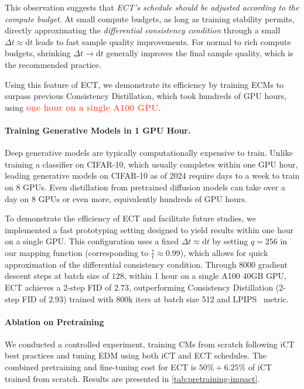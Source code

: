 This observation suggests that \emph{ECT's schedule should be adjusted according to the compute budget}. At small compute budgets, as long as training stability permits, directly approximating the \textit{differential consistency condition} through a small $\Delta t \approx \mathrm{d}t$ leads to fast sample quality improvements. For normal to rich compute budgets, shrinking $\Delta t \to \mathrm{d}t$ generally improves the final sample quality, which is the recommended practice.

Using this feature of ECT, we demonstrate its efficiency by training ECMs to surpass previous Consistency Distillation, which took hundreds of GPU hours, using \textcolor{tomato}{\textbf{one hour on a single A100 GPU}}.

\paragraph{Training Generative Models in 1 GPU Hour.} Deep generative models are typically computationally expensive to train. Unlike training a classifier on CIFAR-10, which usually completes within one GPU hour, leading generative models on CIFAR-10 as of 2024 require days to a week to train on 8 GPUs. Even distillation from pretrained diffusion models can take over a day on 8 GPUs or even more, equivalently hundreds of GPU hours.

To demonstrate the efficiency of ECT and facilitate future studies, we implemented a fast prototyping setting designed to yield results within one hour on a single GPU. This configuration uses a fixed $\Delta t \approx \mathrm{d}t$ by setting $q=256$ in our mapping function (corresponding to $\frac{r}{t} \approx 0.99$), which allows for quick approximation of the differential consistency condition.  Through $8000$ gradient descent steps at batch size of $128$, within 1 hour on a single A100 40GB GPU, ECT achieves a 2-step FID of $2.73$, outperforming Consistency Distillation (2-step FID of $2.93$) trained with 800k iters at batch size 512 and LPIPS~\citep{lpips} metric.


\paragraph{Ablation on Pretraining}
We conducted a controlled experiment, training CMs from scratch following iCT best practices and tuning EDM using both iCT and ECT schedules. The combined pretraining and fine-tuning cost for ECT is $50\% + 6.25\%$ of iCT trained from scratch. Results are presented in \cref{tab:pretraining-impact}.

